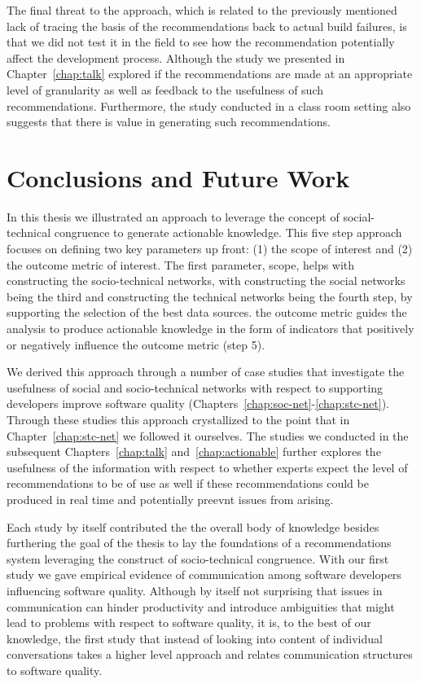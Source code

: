 The final threat to the approach, which is related to the previously mentioned lack of tracing the basis of the recommendations back to actual build failures, is that we did not test it in the field to see how the recommendation potentially affect the development process.
Although the study we presented in Chapter~\ref{chap:talk} explored if the recommendations are made at an appropriate level of granularity as well as feedback to the usefulness of such recommendations.
Furthermore, the study conducted in a class room setting also suggests that there is value in generating such recommendations.

\section{Conclusions and Future Work}
In this thesis we illustrated an approach to leverage the concept of social-technical congruence to generate actionable knowledge.
This five step approach focuses on defining two key parameters up front: (1) the scope of interest and (2) the outcome metric of interest.
The first parameter, scope, helps with constructing the socio-technical networks, with constructing the social networks being the third and constructing the technical networks being the fourth step, by supporting the selection of the best data sources.
the outcome metric guides the analysis to produce actionable knowledge in the form of indicators that positively or negatively influence the outcome metric (step 5). 

We derived this approach through a number of case studies that investigate the usefulness of social and socio-technical networks with respect to supporting developers improve software quality (Chapters~\ref{chap:soc-net}-\ref{chap:stc-net}).
Through these studies this approach crystallized to the point that in Chapter~\ref{chap:stc-net} we followed it ourselves.
The studies we conducted in the subsequent Chapters~\ref{chap:talk} and~\ref{chap:actionable} further explores the usefulness of the information with respect to whether experts expect the level of recommendations to be of use as well if these recommendations could be produced in real time and potentially preevnt issues from arising.

Each study by itself contributed the the overall body of knowledge besides furthering the goal of the thesis to lay the foundations of a recommendations system leveraging the construct of socio-technical congruence.
With our first study we gave empirical evidence of communication among software developers influencing software quality.
Although by itself not surprising that issues in communication can hinder productivity and introduce ambiguities that might lead to problems with respect to software quality, it is, to the best of our knowledge, the first study that instead of looking into content of individual  conversations takes a higher level approach and relates communication structures to software quality.

